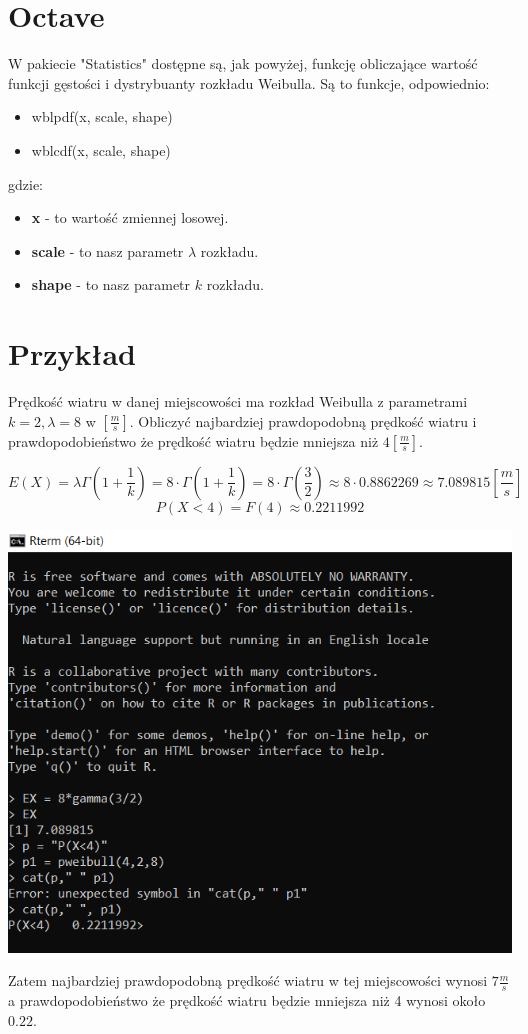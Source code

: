 \documentclass{article}
\begin{document}
\section{Octave}
W pakiecie "Statistics" dostępne są, jak powyżej, funkcję obliczające wartość funkcji gęstości i dystrybuanty rozkładu Weibulla. Są to funkcje, odpowiednio:
\begin{itemize} 
\item wblpdf(x, scale, shape)
\item wblcdf(x, scale, shape)
\end{itemize}
gdzie:
\begin{itemize}
\item \textbf{x} - to wartość zmiennej losowej.
\item \textbf{scale} - to nasz parametr $\lambda$ rozkładu.
\item \textbf{shape} - to nasz parametr $k$ rozkładu.
\end{itemize}

\section{Przykład}
Prędkość wiatru w danej miejscowości ma rozkład Weibulla z parametrami $k = 2, \lambda = 8$ w $[\frac{m}{s}]$. Obliczyć najbardziej prawdopodobną prędkość wiatru i prawdopodobieństwo że prędkość wiatru będzie mniejsza niż $4 [\frac{m}{s}]$. \par
$$E(X) = \lambda \Gamma(1+\frac{1}{k}) = 8\cdot \Gamma(1+\frac{1}{k}) =8\cdot \Gamma(\frac{3}{2}) \approx 8\cdot 0.8862269 \approx 7.089815 [\frac{m}{s}]$$
$$P(X<4) = F(4) \approx 0.2211992$$
\begin{center}
\includegraphics[width=1\textwidth, angle=0]{image2Weibull.png}
\end{center}
Zatem najbardziej prawdopodobną prędkość wiatru w tej miejscowości wynosi $7 \frac{m}{s}$ a prawdopodobieństwo że prędkość wiatru będzie mniejsza niż 4 wynosi około $0.22$.
\end{document}
